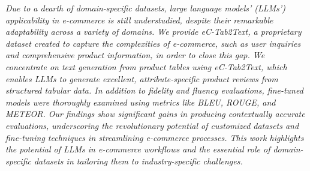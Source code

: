 \textit{Due to a dearth of domain-specific datasets, large language models' (LLMs') applicability in e-commerce is still understudied, despite their remarkable adaptability across a variety of domains. We provide eC-Tab2Text, a proprietary dataset created to capture the complexities of e-commerce, such as user inquiries and comprehensive product information, in order to close this gap. We concentrate on text generation from product tables using eC-Tab2Text, which enables LLMs to generate excellent, attribute-specific product reviews from structured tabular data. In addition to fidelity and fluency evaluations, fine-tuned models were thoroughly examined using metrics like BLEU, ROUGE, and METEOR. Our findings show significant gains in producing contextually accurate evaluations, underscoring the revolutionary potential of customized datasets and fine-tuning techniques in streamlining e-commerce processes. This work highlights the potential of LLMs in e-commerce workflows and the essential role of domain-specific datasets in tailoring them to industry-specific  challenges.}
